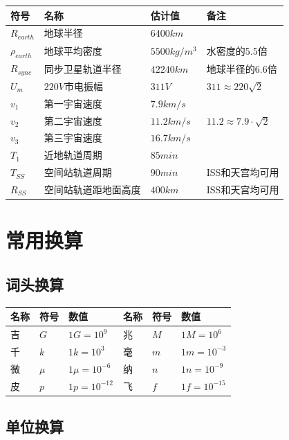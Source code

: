\begin{center}
\begin{tabular}{|l|l|l|l|}
\hline
\textbf{符号} & \textbf{名称} & \textbf{估计值} & \textbf{备注} \\
\hline
$R_{earth}$ & 地球半径  & $6400 km$  & \\
$\rho_{earth}$ & 地球平均密度 & $5500 kg/m^3$ & 水密度的5.5倍 \\
$R_{sync}$ & 同步卫星轨道半径  & $42240km$ & 地球半径的$6.6$倍\\
$U_{m}$ & $220V$市电振幅 & $311 V$ & $311 \approx 220 \sqrt{2}$\\
$v_{1}$ & 第一宇宙速度 & $7.9km/s$ & \\
$v_{2}$ & 第二宇宙速度 & $11.2km/s$ & $11.2 \approx 7.9 \cdot \sqrt{2}$\\
$v_{3}$ & 第三宇宙速度 & $16.7km/s$ & \\
$T_{1}$ & 近地轨道周期 & $85min$ & \\
$T_{SS}$ & 空间站轨道周期 & $90min$ & ISS和天宫均可用\\
$R_{SS}$ & 空间站轨道距地面高度 & $400km$ & ISS和天宫均可用\\
\hline
\end{tabular}
\end{center}

\section{常用换算}

\subsection{词头换算}

\begin{center}
\begin{tabular}{|l|l|l||l|l|l|}
\hline
\textbf{名称} & \textbf{符号} & \textbf{数值} & \textbf{名称} & \textbf{符号} & \textbf{数值} \\
\hline
吉 & $G$ & $1G=10^{9}$ & 兆 & $M$ & $1M = 10^6$ \\ 
千 & $k$ & $1k=10^3$  & 毫 & $m$ & $1m=10^{-3}$\\
微 & $\mu$ & $1\mu = 10^{-6}$ & 纳 & $n$ & $1n=10^{-9}$\\
皮 & $p$ & $1p = 10^{-12}$ & 飞 & $f$ & $1f=10^{-15}$\\
\hline
\end{tabular}
\end{center}

\subsection{单位换算}

